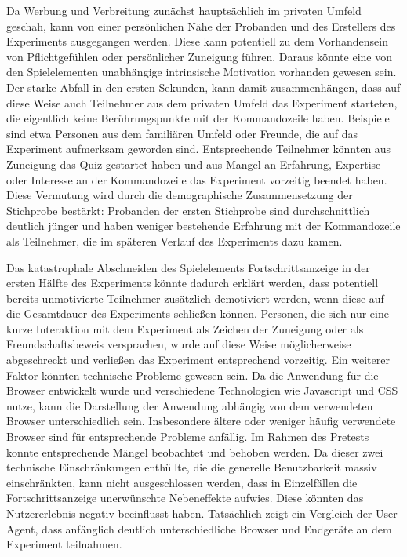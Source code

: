 Da Werbung und Verbreitung zunächst hauptsächlich im privaten Umfeld geschah, kann von einer persönlichen Nähe der Probanden und des Erstellers des Experiments ausgegangen werden. Diese kann potentiell zu dem Vorhandensein von Pflichtgefühlen oder persönlicher Zuneigung führen. Daraus könnte eine von den Spielelementen unabhängige intrinsische Motivation vorhanden gewesen sein. Der starke Abfall in den ersten Sekunden, kann damit zusammenhängen, dass auf diese Weise auch Teilnehmer aus dem privaten Umfeld das Experiment starteten, die eigentlich keine Berührungspunkte mit der Kommandozeile haben. Beispiele sind etwa Personen aus dem familiären Umfeld oder Freunde, die auf das Experiment aufmerksam geworden sind. Entsprechende Teilnehmer könnten aus Zuneigung das Quiz gestartet haben und aus Mangel an Erfahrung, Expertise oder Interesse an der Kommandozeile das Experiment vorzeitig beendet haben. Diese Vermutung wird durch die demographische Zusammensetzung der Stichprobe bestärkt: Probanden der ersten Stichprobe sind durchschnittlich deutlich jünger und haben weniger bestehende Erfahrung mit der Kommandozeile als Teilnehmer, die im späteren Verlauf des Experiments dazu kamen.

Das katastrophale Abschneiden des Spielelements Fortschrittsanzeige in der ersten Hälfte des Experiments könnte dadurch erklärt werden, dass potentiell bereits unmotivierte Teilnehmer zusätzlich demotiviert werden, wenn diese auf die Gesamtdauer des Experiments schließen können. Personen, die sich nur eine kurze Interaktion mit dem Experiment als Zeichen der Zuneigung oder als Freundschaftsbeweis versprachen, wurde auf diese Weise möglicherweise abgeschreckt und verließen das Experiment entsprechend vorzeitig. Ein weiterer Faktor könnten technische Probleme gewesen sein. Da die Anwendung für die Browser entwickelt wurde und verschiedene Technologien wie Javascript und CSS nutze, kann die Darstellung der Anwendung abhängig von dem verwendeten Browser unterschiedlich sein. Insbesondere ältere oder weniger häufig verwendete Browser sind für entsprechende Probleme anfällig. Im Rahmen des Pretests konnte entsprechende Mängel beobachtet und behoben werden. Da dieser zwei technische Einschränkungen enthüllte, die die generelle Benutzbarkeit massiv einschränkten, kann nicht ausgeschlossen werden, dass in Einzelfällen die Fortschrittsanzeige unerwünschte Nebeneffekte aufwies. Diese könnten das Nutzererlebnis negativ beeinflusst haben. Tatsächlich zeigt ein Vergleich der User-Agent, dass anfänglich deutlich unterschiedliche Browser und Endgeräte an dem Experiment teilnahmen.  


